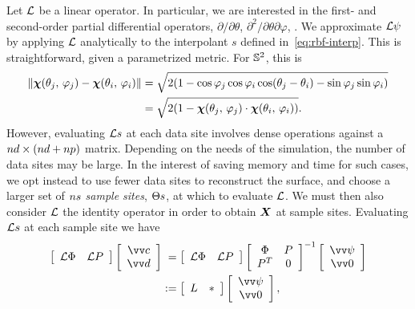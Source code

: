 Let $\mathcal{L}$ be a linear operator. In particular, we are interested in the first- and
second-order partial differential operators, $\partial/\partial\theta$,
$\partial^2/\partial\theta\partial\varphi$, . We approximate $\mathcal{L}\psi$ by
applying $\mathcal{L}$ analytically to the interpolant $s$ defined in~\eqref{eq:rbf-interp}. This
is straightforward, given a parametrized metric. For $\mathbb{S}^2$, this is
\begin{equation}\label{eq:sphere-metric}
    \begin{aligned}
    \|\boldsymbol{\chi}(\theta_j,\,\varphi_j) - \boldsymbol{\chi}(\theta_i,\,\varphi_i)\|
    &= \sqrt{2(1 - \cos\varphi_j\cos\varphi_i\cos(\theta_j-\theta_i) - \sin\varphi_j\sin\varphi_i)} \\
    &= \sqrt{2(1-\boldsymbol{\chi}(\theta_j,\,\varphi_j)\cdot\boldsymbol{\chi}(\theta_i,\,\varphi_i))}.
\end{aligned}
\end{equation}
However, evaluating $\mathcal{L} s$ at each data site involves dense operations against a
$\data\cardinality\times(\data\cardinality+\poly\cardinality)$ matrix. Depending on the
needs of the simulation, the number of data sites may be large.  In the interest of
saving memory and time for such cases, we opt instead to use fewer data sites to
reconstruct the surface, and choose a larger set of $\sample\cardinality$ \emph{sample
sites}, $\sample\sites$, at which to evaluate $\mathcal{L}$. We must then also consider $\mathcal{L}$ the
identity operator in order to obtain $\boldsymbol{X}$ at sample sites. Evaluating $\mathcal{L} s$ at each
sample site we have
\begin{equation}\label{eq:rbf-operator}
    \begin{aligned}
    \left[\begin{array}{cc}
            \L\Phi & \L P
    \end{array}\right]\left[\begin{array}{c}
            \arr{c} \\ \arr{d}
    \end{array}\right] &\hphantom{:}=
    \left[\begin{array}{cc}
            \L\Phi & \L P
    \end{array}\right]\left[\begin{array}{cc}
            \Phi & P \\ P^T & 0
    \end{array}\right]^{-1}\left[\begin{array}{c}
            \arr{\psi} \\ \arr{0}
    \end{array}\right] \\ &:=
    \left[\begin{array}{cc}
            L & \ast
    \end{array}\right]\left[\begin{array}{c}
            \arr{\psi} \\ \arr{0}
    \end{array}\right],
\end{aligned}
\end{equation}
